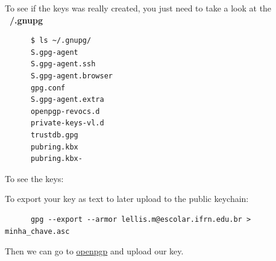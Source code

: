 \documentclass{article}
\begin{document}
To see if the keys was really created, you just need to take a look at the \textbf{~/.gnupg}

\begin{verbatim}
      $ ls ~/.gnupg/
      S.gpg-agent
      S.gpg-agent.ssh
      S.gpg-agent.browser
      gpg.conf
      S.gpg-agent.extra
      openpgp-revocs.d
      private-keys-vl.d
      trustdb.gpg
      pubring.kbx
      pubring.kbx-
\end{verbatim}

To see the keys: 


To export your key as text to later upload to the public keychain:

\begin{verbatim}
      gpg --export --armor lellis.m@escolar.ifrn.edu.br > minha_chave.asc
\end{verbatim}

Then we can go to \href{https://keys.openpgp.org/}{openpgp} and upload our key.



\end{document}

